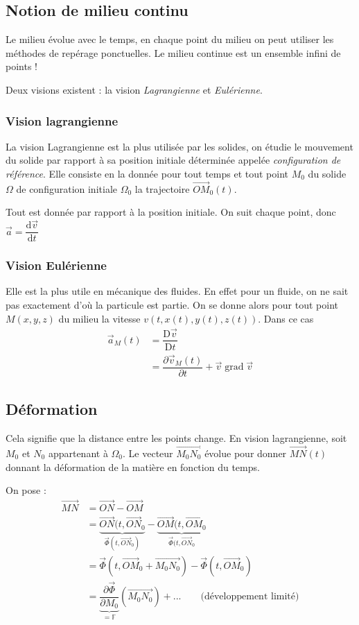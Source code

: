 \documentclass{article}
\newcommand{\deriv}{\mathrm{d}}
\newcommand{\Deriv}{\mathrm{D}}
\newcommand{\grad}{\;\mathrm{grad}\;}
\begin{document}
\subsection{Notion de milieu continu}
Le milieu évolue avec le temps, en chaque point du milieu on peut utiliser les méthodes de repérage ponctuelles. Le milieu continue est un ensemble infini de points !

Deux visions existent : la vision \emph{Lagrangienne} et \emph{Eulérienne}.

\subsubsection{Vision lagrangienne}
La vision Lagrangienne est la plus utilisée par les solides, on étudie le mouvement du solide par rapport à sa position initiale déterminée appelée \emph{configuration de référence}. Elle consiste en la donnée pour tout temps et tout point $M_0$ du solide $\Omega$ de configuration initiale $\Omega_0$ la trajectoire $\overrightarrow{OM}_0(t)$.

Tout est donnée par rapport à la position initiale. On suit chaque point, donc $\vec{a}=\dfrac{\deriv \vec{v}}{\deriv t}$


\subsubsection{Vision Eulérienne}
Elle est la plus utile en mécanique des fluides. En effet pour un fluide, on ne sait pas exactement d'où la particule est partie. On se donne alors pour tout point $M(x,y,z)$ du milieu la vitesse $v(t,x(t),y(t),z(t))$. Dans ce cas
\begin{align*}
\vec{a}_M (t) & = \dfrac{\Deriv \vec{v}}{\Deriv t}\\
& = \dfrac{\partial \vec{v}_M(t)}{\partial t} + \vec{v} \grad \vec{v}
\end{align*}


\subsection{Déformation}
Cela signifie que la distance entre les points change. En vision lagrangienne, soit $M_0$ et $N_0$ appartenant à $\Omega_0$. Le vecteur $\overrightarrow{M_0N_0}$ évolue pour donner $\overrightarrow{MN}(t)$ donnant la déformation de la matière en fonction du temps.

On pose :
\begin{align*}
\overrightarrow{MN} & = \overrightarrow{ON} - \overrightarrow{OM}\\
& = \underbrace{\overrightarrow{ON}(t,\overrightarrow{ON}_0}_{\vec{\Phi}(t,\overrightarrow{ON}_0)} - \underbrace{\overrightarrow{OM}(t,\overrightarrow{OM}_0}_{\vec{\Phi}(t,\overrightarrow{ON}_0}\\
& = \vec{\Phi}(t, \overrightarrow{OM}_0 + \overrightarrow{M_0N_0}) - \vec{\Phi}(t, \overrightarrow{OM}_0)\\
& = \underbrace{\dfrac{\partial \vec{\Phi}}{\partial M_0}}_{= \mathbb{F}} (\overrightarrow{M_0N_0}) + ... \qquad \text{(développement limité)}
\end{align*}
\end{document}

